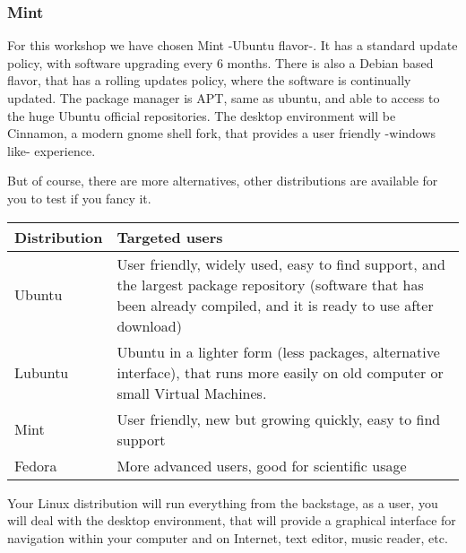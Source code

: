 \documentclass[a4paper]{article}
\begin{document}
\subsubsection{Mint}
For this workshop we have chosen Mint -Ubuntu flavor-. It has a standard update policy, with software upgrading every 6 months. There is also a Debian based flavor, that has a rolling updates policy, where the software is continually updated. The package manager is APT, same as ubuntu, and able to access to the huge Ubuntu official repositories. The desktop environment will be Cinnamon, a modern gnome shell fork, that provides a user friendly -windows like- experience.

But of course, there are more alternatives, other distributions are available for you to test if you fancy it.\\
\begin{tabular}{|l|l|}
\hline
Distribution & Targeted users\\
\hline
Ubuntu & User friendly, widely used, easy to find support, and the largest package repository (software that has been already compiled, and it is ready to use after download) \\
\hline
Lubuntu & Ubuntu in a lighter form (less packages, alternative interface), that runs more easily on old computer or small Virtual Machines. \\
\hline
Mint & User friendly, new but growing quickly, easy to find support \\
\hline
Fedora & More advanced users, good for scientific usage\\
\hline
\end{tabular}

Your Linux distribution will run everything from the backstage, as a user, you will deal with the desktop environment, that will provide a graphical interface for navigation within your computer and on Internet, text editor, music reader, etc. 
\end{document}
